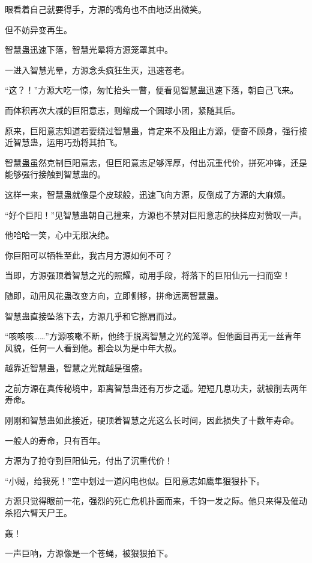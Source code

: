 
\begin{this_body}

眼看着自己就要得手，方源的嘴角也不由地泛出微笑。

但不妨异变再生。

智慧蛊迅速下落，智慧光晕将方源笼罩其中。

一进入智慧光晕，方源念头疯狂生灭，迅速苍老。

“这？！”方源大吃一惊，匆忙抬头一瞥，便看见智慧蛊迅速下落，朝自己飞来。

而体积再次大减的巨阳意志，则缩成一个圆球小团，紧随其后。

原来，巨阳意志知道若要绕过智慧蛊，肯定来不及阻止方源，便奋不顾身，强行接近智慧蛊，运用巧劲将其拍飞。

智慧蛊虽然克制巨阳意志，但巨阳意志足够浑厚，付出沉重代价，拼死冲锋，还是能够强行接触到智慧蛊的。

这样一来，智慧蛊就像是个皮球般，迅速飞向方源，反倒成了方源的大麻烦。

“好个巨阳！”见智慧蛊朝自己撞来，方源也不禁对巨阳意志的抉择应对赞叹一声。

他哈哈一笑，心中无限决绝。

你巨阳可以牺牲至此，我古月方源如何不可？

当即，方源强顶着智慧之光的照耀，动用手段，将落下的巨阳仙元一扫而空！

随即，动用风花蛊改变方向，立即侧移，拼命远离智慧蛊。

智慧蛊直接坠落下去，方源几乎和它擦肩而过。

“咳咳咳……”方源咳嗽不断，他终于脱离智慧之光的笼罩。但他面目再无一丝青年风貌，任何一人看到他。都会以为是中年大叔。

越靠近智慧蛊，智慧之光就越是强盛。

之前方源在真传秘境中，距离智慧蛊还有万步之遥。短短几息功夫，就被削去两年寿命。

刚刚和智慧蛊如此接近，硬顶着智慧之光这么长时间，因此损失了十数年寿命。

一般人的寿命，只有百年。

方源为了抢夺到巨阳仙元，付出了沉重代价！

“小贼，给我死！”空中划过一道闪电也似。巨阳意志如鹰隼狠狠扑下。

方源只觉得眼前一花，强烈的死亡危机扑面而来，千钧一发之际。他只来得及催动杀招六臂天尸王。

轰！

一声巨响，方源像是一个苍蝇，被狠狠拍下。


\end{this_body}
